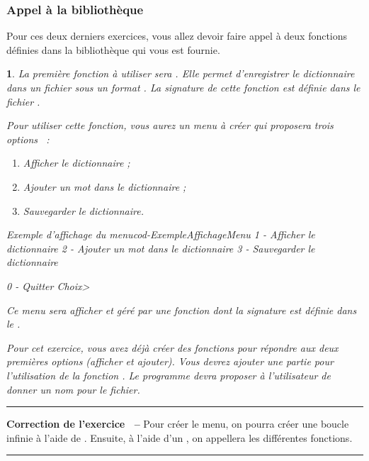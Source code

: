 \documentclass[a4paper]{article}
\newenvironment{Correction}{\par\tiny\blue\rule[1ex]{\textwidth}{1pt}\par\normalsize\textbf{\sffamily{}Correction de l'exercice~\theExo{} -- }}{\par\tiny\blue\rule[1ex]{\textwidth}{1pt}\par}
\newtheorem{Exo}{{\sffamily{Exercice}}}
\begin{document}
			\subsubsection{Appel à la bibliothèque}
				Pour ces deux derniers exercices, vous allez devoir faire appel à deux fonctions définies dans la bibliothèque qui vous est fournie.
				\begin{Exo}\label{exo-EcrireDictionnaire}
					La première fonction à utiliser sera .
					Elle permet d'enregistrer le dictionnaire dans un fichier sous un format .
					La signature de cette fonction est définie dans le fichier  .

					Pour utiliser cette fonction, vous aurez un menu à créer qui proposera trois options ~:
					\begin{enumerate}
						\item Afficher le dictionnaire ;
						\item Ajouter un mot dans le dictionnaire ;
						\item Sauvegarder le dictionnaire.
					\end{enumerate}
					\begin{Code}[language={}]{Exemple d'affichage du menu}{cod-ExempleAffichageMenu}
1 - Afficher le dictionnaire
2 - Ajouter un mot dans le dictionnaire
3 - Sauvegarder le dictionnaire

0 - Quitter
Choix>
					\end{Code}
					Ce menu sera afficher et géré par une fonction dont la signature est définie dans le .

					Pour cet exercice, vous avez déjà créer des fonctions pour répondre aux deux premières options (\emph{afficher} et \emph{ajouter}).
					Vous devrez ajouter une partie pour l'utilisation de la fonction .
					Le programme devra proposer à l'utilisateur de donner un nom pour le fichier.
				\end{Exo}
				\begin{Correction}
					Pour créer le menu, on pourra créer une boucle infinie à l'aide de  .
					Ensuite, à l'aide d'un , on appellera les différentes fonctions.
				\end{Correction}
\end{document}

